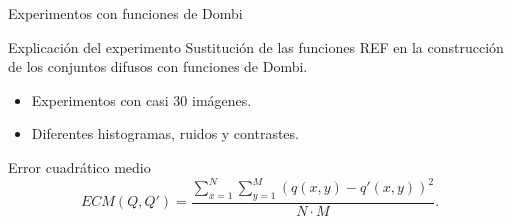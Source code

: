 \documentclass{beamer}
\theoremstyle{plain} %
\theoremstyle{definition}
\begin{document}
\begin{frame}{Experimentos con funciones de Dombi}
  \begin{block}{Explicación del experimento}
    Sustitución de las funciones REF en la construcción de los conjuntos difusos con funciones de Dombi.
  \end{block}
  \begin{itemize}
    \item Experimentos con casi 30 imágenes.
    \item Diferentes histogramas, ruidos y contrastes.
  \end{itemize}
  \begin{block}{Error cuadrático medio}
    $$ECM(Q, Q') = \frac{\sum_{x=1}^N\sum_{y=1}^M \left(q(x,y)-q'(x,y)\right)^2}{N\cdot M}.$$
  \end{block}
\end{frame}
\end{document}
